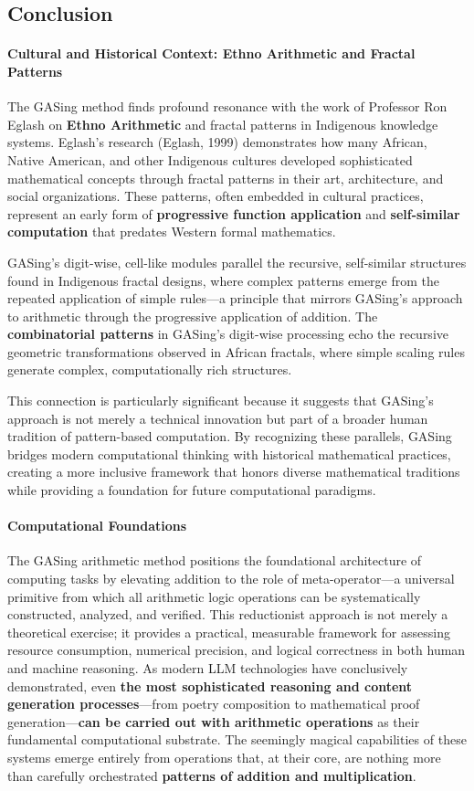 \documentclass[11pt,a4paper]{article}
\begin{document}
\subsection{Conclusion}
\paragraph{Cultural and Historical Context: Ethno Arithmetic and Fractal Patterns}
The GASing method finds profound resonance with the work of Professor Ron Eglash on \textbf{Ethno Arithmetic} and fractal patterns in Indigenous knowledge systems. Eglash's research (Eglash, 1999) demonstrates how many African, Native American, and other Indigenous cultures developed sophisticated mathematical concepts through fractal patterns in their art, architecture, and social organizations. These patterns, often embedded in cultural practices, represent an early form of \textbf{progressive function application} and \textbf{self-similar computation} that predates Western formal mathematics.

GASing's digit-wise, cell-like modules parallel the recursive, self-similar structures found in Indigenous fractal designs, where complex patterns emerge from the repeated application of simple rules—a principle that mirrors GASing's approach to arithmetic through the progressive application of addition. The \textbf{combinatorial patterns} in GASing's digit-wise processing echo the recursive geometric transformations observed in African fractals, where simple scaling rules generate complex, computationally rich structures.

This connection is particularly significant because it suggests that GASing's approach is not merely a technical innovation but part of a broader human tradition of pattern-based computation. By recognizing these parallels, GASing bridges modern computational thinking with historical mathematical practices, creating a more inclusive framework that honors diverse mathematical traditions while providing a foundation for future computational paradigms.

\paragraph{Computational Foundations}
The GASing arithmetic method positions the foundational architecture of computing tasks by elevating addition to the role of meta-operator—a universal primitive from which all arithmetic logic operations can be systematically constructed, analyzed, and verified. This reductionist approach is not merely a theoretical exercise; it provides a practical, measurable framework for assessing resource consumption, numerical precision, and logical correctness in both human and machine reasoning. As modern LLM technologies have conclusively demonstrated, even \textbf{the most sophisticated reasoning and content generation processes}—from poetry composition to mathematical proof generation—\textbf{can be carried out with arithmetic operations} as their fundamental computational substrate. The seemingly magical capabilities of these systems emerge entirely from operations that, at their core, are nothing more than carefully orchestrated \textbf{patterns of addition and multiplication}.
\end{document}
